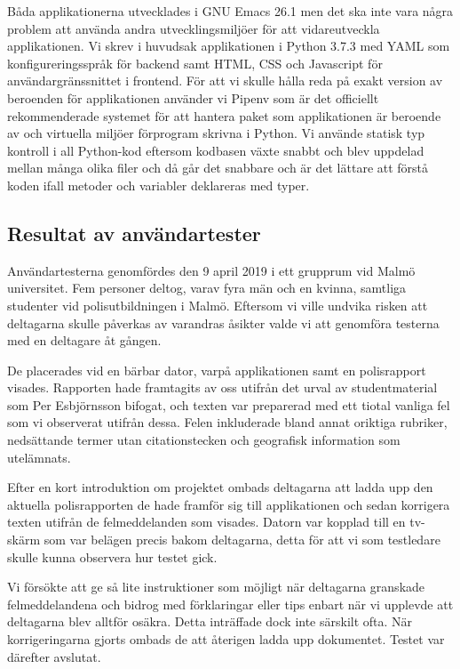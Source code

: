 \documentclass[swedish]{maucsthesis}
\begin{document}
Båda applikationerna utvecklades i GNU Emacs 26.1 men det ska inte vara några
problem att använda andra utvecklingsmiljöer för att vidareutveckla
applikationen. Vi skrev i huvudsak applikationen i Python 3.7.3 med YAML som
konfigureringsspråk för backend samt HTML, CSS och Javascript för
användargränssnittet i frontend. För att vi skulle hålla reda på exakt version
av beroenden för applikationen använder vi Pipenv som är det officiellt
rekommenderade systemet för att hantera paket som applikationen är beroende av
och virtuella miljöer förprogram skrivna i Python. Vi använde statisk typ
kontroll i all Python-kod eftersom kodbasen växte snabbt och blev uppdelad
mellan många olika filer och då går det snabbare och är det lättare att förstå
koden ifall metoder och variabler deklareras med typer.


\subsection{Resultat av användartester}

Användartesterna genomfördes den 9 april 2019 i ett grupprum vid Malmö
universitet. Fem personer deltog, varav fyra män och en kvinna, samtliga
studenter vid polisutbildningen i Malmö. Eftersom vi ville undvika risken att
deltagarna skulle påverkas av varandras åsikter valde vi att genomföra testerna
med en deltagare åt gången.

De placerades vid en bärbar dator, varpå applikationen samt en polisrapport
visades. Rapporten hade framtagits av oss utifrån det urval av studentmaterial
som Per Esbjörnsson bifogat, och texten var preparerad med ett tiotal vanliga
fel som vi observerat utifrån dessa. Felen inkluderade bland annat oriktiga
rubriker, nedsättande termer utan citationstecken och geografisk information som
utelämnats.

Efter en kort introduktion om projektet ombads deltagarna att ladda upp den
aktuella polisrapporten de hade framför sig till applikationen och sedan
korrigera texten utifrån de felmeddelanden som visades. Datorn var kopplad till
en tv-skärm som var belägen precis bakom deltagarna, detta för att vi som
testledare skulle kunna observera hur testet gick.

Vi försökte att ge så lite instruktioner som möjligt när deltagarna granskade
felmeddelandena och bidrog med förklaringar eller tips enbart när vi upplevde
att deltagarna blev alltför osäkra. Detta inträffade dock inte särskilt ofta.
När korrigeringarna gjorts ombads de att återigen ladda upp dokumentet. Testet
var därefter avslutat.
\end{document}
